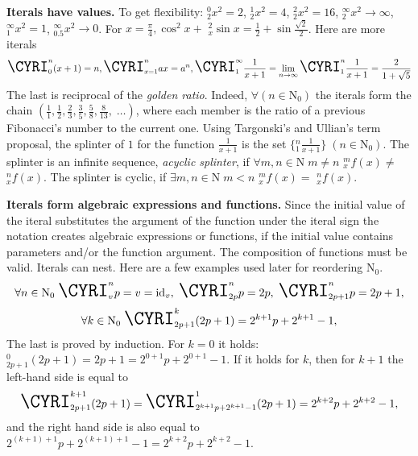 \documentclass{article}
\begin{document}
\textbf{Iterals have values.} To get flexibility: \CYRI$_2^0{x^2} = 2$, \CYRI$_2^1{x^2} = 4$, \CYRI$_2^2{x^2} = 16$, \CYRI$_2^\infty{x^2} \to \infty$, \CYRI$_1^\infty{x^2} = 1$, \CYRI$_{0.5}^\infty{x^2} \to 0$. For $x = \frac{\pi}{4}, \cos^2{x} + $ \CYRI$_{x}^2\sin x = \frac{1}{2} + \sin \frac{\sqrt{2}}{2}$. Here are more iterals
\begin{displaymath}
\textrm{\LARGE{\CYRI}}_{0}^{n}(x + 1) = n, \textrm{\LARGE{\CYRI}}_{x=1}^{n}ax = a^n, \textrm{\LARGE{\CYRI}}_{1}^{\infty}\frac{1}{x + 1} = \lim_{n \to \infty} \textrm{\LARGE{\CYRI}}_{1}^{n}\frac{1}{x + 1} = \frac{2}{1 + \sqrt{5}}
\end{displaymath}
The last is reciprocal of the \textit{golden ratio}. Indeed, $\forall (n \in \mathrm{N_0})$ the iterals form the chain $(\frac{1}{1}, \frac{1}{2}, \frac{2}{3}, \frac{3}{5}, \frac{5}{8}, \frac{8}{13}, \; \ldots)$, where each member is the ratio of a previous Fibonacci's number to the current one. Using Targonski's and Ullian's term proposal, the splinter of $1$ for the function $\frac{1}{x + 1}$ is the set $\{$\CYRI$_{1}^{n}\frac{1}{x + 1}\} \; (n \in \mathrm{N_0})$. The splinter is an infinite sequence, \textit{acyclic splinter}, if $\forall m,n \in \mathrm{N} \; m \neq n$ \CYRI$_{x}^m f(x) \neq$ \CYRI$_{x}^n f(x)$. The splinter is cyclic, if $\exists m,n \in \mathrm{N} \; m < n$ \CYRI$_{x}^m f(x) =$ \CYRI$_{x}^n f(x)$. 

\textbf{Iterals form algebraic expressions and functions.} Since the initial value of the iteral substitutes the argument of the function under the iteral sign the notation creates algebraic expressions or functions, if the initial value contains parameters and/or the function argument. The composition of functions must be valid. Iterals can nest. Here are a few examples used later for reordering $\mathrm{N_0}$.
\begin{displaymath}
\forall n \in \mathrm{N_0} \; \textrm{\LARGE{\CYRI}}_{v}^{n}p = v = \mathrm{id}_v, \;  \textrm{\LARGE{\CYRI}}_{2p}^{n}p = 2p, \; \textrm{\LARGE{\CYRI}}_{2p+1}^{n}p = 2p+1,
\end{displaymath}
\begin{displaymath}
\forall k \in \mathrm{N_0} \; \textrm{\LARGE{\CYRI}}_{2p+1}^{k}(2p+1) = 2^{k+1}p+2^{k+1}-1,
\end{displaymath}
The last is proved by induction. For $k = 0$ it holds: \CYRI$_{2p+1}^{0}(2p+1) = 2p + 1 = 2^{0+1}p+2^{0+1}-1$. If it holds for $k$, then for $k + 1$ the left-hand side is equal to
\begin{displaymath}
\textrm{\LARGE{\CYRI}}_{2p+1}^{k+1}(2p+1) = \textrm{\LARGE{\CYRI}}_{2^{k+1}p+2^{k+1}-1}^{1}(2p+1) = 2^{k+2}p+2^{k+2}-1,
\end{displaymath}
and the right hand side is also equal to $2^{(k + 1)+1}p+2^{(k + 1)+1}-1 = 2^{k + 2}p+2^{k + 2}-1$.
\end{document}
